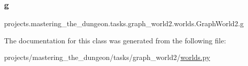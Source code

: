 \subsubsection{\texorpdfstring{g}{g}}
{\footnotesize\ttfamily projects.\+mastering\+\_\+the\+\_\+dungeon.\+tasks.\+graph\+\_\+world2.\+worlds.\+Graph\+World2.\+g}



The documentation for this class was generated from the following file\+:\begin{DoxyCompactItemize}
\item 
projects/mastering\+\_\+the\+\_\+dungeon/tasks/graph\+\_\+world2/\hyperlink{projects_2mastering__the__dungeon_2tasks_2graph__world2_2worlds_8py}{worlds.\+py}\end{DoxyCompactItemize}

